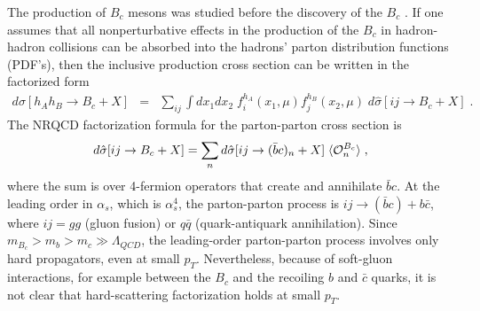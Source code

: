 The production of $B_c$ mesons was studied before the discovery of the
$B_c$
\cite{Chang:bb,Braaten:1993jn,Chang:1992jb,Chang:1994aw,Chang:1996jt,
Kolodziej:1995nv,Berezhnoy:an,Baranov:wy,Berezhnoi:1997fp}. If one
assumes that all nonperturbative effects in the production of the $B_c$
in hadron-hadron collisions can be absorbed into the hadrons' parton
distribution functions (PDF's), then the inclusive production cross
section can be written in the factorized form
%
\begin{eqnarray}
d\sigma[h_A h_B \rightarrow B_c + X] &=& \sum_{ij} 
\int dx_{1} dx_{2} \; f^{h_A}_i(x_{1},\mu) f^{h_B}_j(x_{2},\mu)\; 
d\hat{\sigma}[ij \rightarrow B_c + X] \;.
\label{prodsec:Bccross}
\end{eqnarray}
%
The NRQCD factorization formula for the parton-parton cross section is
%
\begin{eqnarray}
d\hat{\sigma}[ij \rightarrow B_{c} + X] =
\sum_n d\hat{\sigma}[ij \rightarrow (\bar b c)_n + X] \; 
\langle {\cal O}_n^{B_c} \rangle \;,
\label{prodsec:Bcsubcross}
\end{eqnarray}
%
where the sum is over 4-fermion operators that create and annihilate
$\bar b c$. At the leading order in $\alpha_s$, which is $\alpha_s^4$,
the parton-parton process is $i j \to (\bar b c) + b \bar{c}$, where $ij
= gg$ (gluon fusion) or $q \bar q$ (quark-antiquark annihilation). Since
$m_{B_c}> m_b > m_c\gg \Lambda_{QCD}$, the leading-order parton-parton
process involves only hard propagators, even at small $p_T$.
Nevertheless, because of soft-gluon interactions, for example between
the $B_c$ and the recoiling $b$ and $\bar c$ quarks, it is not clear
that hard-scattering factorization holds at small $p_T$.

